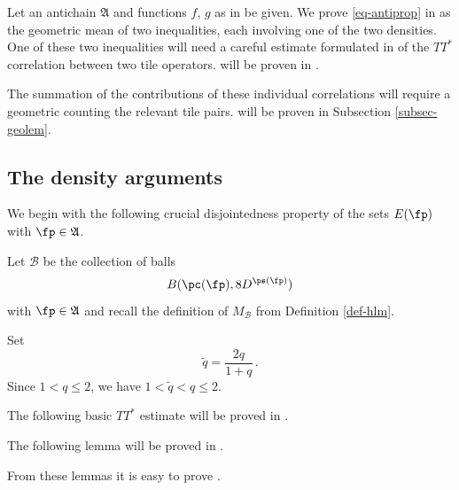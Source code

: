 \label{antichainboundary}

Let an antichain $\mathfrak{A}$
and functions $f$, $g$ as in  be given.
We prove \eqref{eq-antiprop}
in 
as the geometric mean of two inequalities,
each involving one of the two densities.
One of these two inequalities will need a careful estimate formulated in
 of
the $TT^*$ correlation between two tile operators.
 will be proven in
.

The summation of the contributions of these individual correlations will require a
geometric  counting the relevant tile pairs.
 will be proven in Subsection
\ref{subsec-geolem}.






\subsection{The density arguments}\label{sec-TT*-T*T}

We begin with the following crucial disjointedness property of the sets $E(\fp)$ with $\fp \in \mathfrak{A}$.




Let $\mathcal{B}$ be the collection of balls
\begin{equation}
    B(\pc(\fp), 8D^{\ps(\fp)})
\end{equation}
with $\fp\in \mathfrak{A}$ and recall the definition of
$M_{\mathcal{B}}$ from Definition \ref{def-hlm}.




Set
\begin{equation}
    \tilde{q}=\frac {2q}{1+q}\,.
\end{equation}
Since $1< q\le 2$, we have $1<\tilde{q}<q\le 2$.





The following basic $TT^*$ estimate will be proved in .

The following lemma will be proved in .

From these lemmas it is easy to prove .



